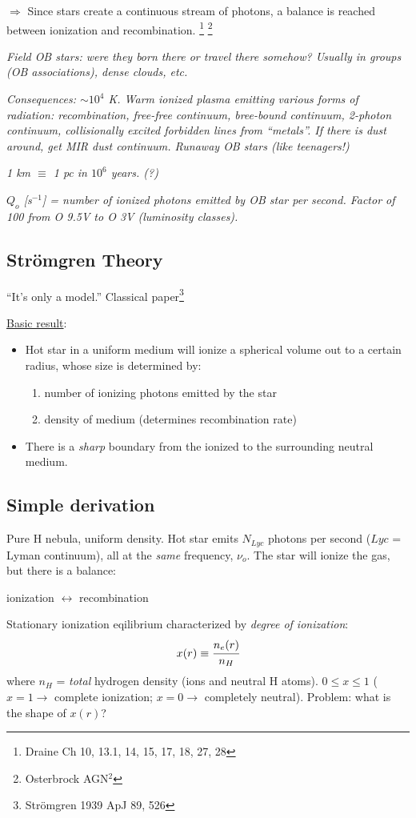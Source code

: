 \documentclass[11pt]{article}
\newcommand{\mar}[1]{\hspace{0pt}\marginpar{-\textcolor{black}{#1}-}}
\newcommand{\mynotes}[1]{{\fontfamily{cmss}\selectfont \textit{#1}}}
\begin{document}
\textcolor{bred}{$\Longrightarrow$}
{Since stars create a continuous stream of photons, a
balance is reached between ionization and recombination.}
\footnote{Draine Ch 10, 13.1, 14, 15, 17, 18, 27, 28}
\footnote{Osterbrock AGN$^{2}$}

\mynotes{Field OB stars: were they born there or travel there somehow? Usually
in groups (OB associations), dense clouds, etc.}

\mynotes{Consequences: $\sim 10^{4}$ K. Warm ionized plasma emitting various forms
of radiation: recombination, free-free continuum, bree-bound continuum,
2-photon continuum, collisionally excited forbidden lines from ``metals''.
If there is dust around, get MIR dust continuum. Runaway OB stars (like
teenagers!)}

\mynotes{1 km $\equiv$ 1 pc in $10^{6}$ years. (?)}

\mynotes{$Q_{o}$ [s$^{-1}$]
= number of ionized photons emitted by OB star per second.
Factor of 100 from O 9.5V to O 3V (luminosity classes).}

\subsection{Str\"{o}mgren Theory}
\mar{52}``It's only a model.''
Classical paper\footnote{Str\"{o}mgren 1939 ApJ 89, 526}

\underline{Basic result}:
\begin{itemize}
    \item Hot star in a uniform medium will ionize a spherical volume
        out to a certain radius, whose size is determined by:
        \begin{enumerate}
            \item number of ionizing photons emitted by the star
            \item density of medium (determines recombination rate)
        \end{enumerate}
    \item There is a \emph{sharp} boundary from the ionized to the
        surrounding neutral medium.
\end{itemize}
\subsection{Simple derivation}
Pure H nebula, uniform density. Hot star emits $N_{Lyc}$ photons per
second ($Lyc$ = Lyman continuum), all at the \emph{same} frequency, $\nu_{o}$.
The star will ionize the gas, but there is a balance:
\begin{center}
    \vspace{-2ex}ionization $\longleftrightarrow$ recombination\vspace{-2ex}
\end{center}
Stationary ionization eqilibrium characterized by \textit{degree of ionization}:
\[
    x(r) \equiv \cfrac{n_{e}(r)}{n_{H}}
    \]
where $n_{H}$ = \emph{total}
hydrogen density (ions and neutral H atoms).
$0 \le x \le 1$ ($x = 1 \rightarrow$ complete ionization; $x = 0
\rightarrow$ completely neutral). Problem: what is the shape of $x(r)$?
\end{document}

